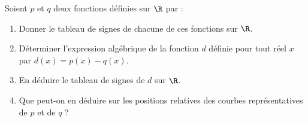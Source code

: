 \begin{exo}{}
	Soient $p$ et $q$ deux fonctions définies sur $\R$ par : 
	\begin{enumerate}
		\item Donner le tableau de signes de chacune de ces fonctions sur $\R$.
		\item Déterminer l'expression algébrique de la fonction $d$ définie pour tout réel $x$ par $d(x) = p(x) - q(x)$.
		\item En déduire le tableau de signes de $d$ sur $\R$.
		\item Que peut-on en déduire sur les positions relatives des courbes représentatives de $p$ et de $q$ ?
	\end{enumerate}
\end{exo}
